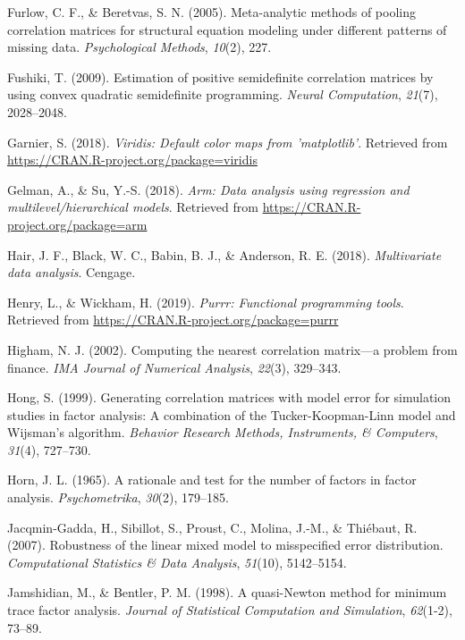 \documentclass[
  english,
  man]{apa6}
\begin{document}
\leavevmode\hypertarget{ref-furlow2005}{}%
Furlow, C. F., \& Beretvas, S. N. (2005). Meta-analytic methods of pooling correlation matrices for structural equation modeling under different patterns of missing data. \emph{Psychological Methods}, \emph{10}(2), 227.

\leavevmode\hypertarget{ref-fushiki2009}{}%
Fushiki, T. (2009). Estimation of positive semidefinite correlation matrices by using convex quadratic semidefinite programming. \emph{Neural Computation}, \emph{21}(7), 2028--2048.

\leavevmode\hypertarget{ref-R-viridis}{}%
Garnier, S. (2018). \emph{Viridis: Default color maps from 'matplotlib'}. Retrieved from \url{https://CRAN.R-project.org/package=viridis}

\leavevmode\hypertarget{ref-R-arm}{}%
Gelman, A., \& Su, Y.-S. (2018). \emph{Arm: Data analysis using regression and multilevel/hierarchical models}. Retrieved from \url{https://CRAN.R-project.org/package=arm}

\leavevmode\hypertarget{ref-hair2018}{}%
Hair, J. F., Black, W. C., Babin, B. J., \& Anderson, R. E. (2018). \emph{Multivariate data analysis}. Cengage.

\leavevmode\hypertarget{ref-R-purrr}{}%
Henry, L., \& Wickham, H. (2019). \emph{Purrr: Functional programming tools}. Retrieved from \url{https://CRAN.R-project.org/package=purrr}

\leavevmode\hypertarget{ref-higham2002}{}%
Higham, N. J. (2002). Computing the nearest correlation matrix---a problem from finance. \emph{IMA Journal of Numerical Analysis}, \emph{22}(3), 329--343.

\leavevmode\hypertarget{ref-hong1999}{}%
Hong, S. (1999). Generating correlation matrices with model error for simulation studies in factor analysis: A combination of the Tucker-Koopman-Linn model and Wijsman's algorithm. \emph{Behavior Research Methods, Instruments, \& Computers}, \emph{31}(4), 727--730.

\leavevmode\hypertarget{ref-horn1965}{}%
Horn, J. L. (1965). A rationale and test for the number of factors in factor analysis. \emph{Psychometrika}, \emph{30}(2), 179--185.

\leavevmode\hypertarget{ref-jacqmin2007}{}%
Jacqmin-Gadda, H., Sibillot, S., Proust, C., Molina, J.-M., \& Thiébaut, R. (2007). Robustness of the linear mixed model to misspecified error distribution. \emph{Computational Statistics \& Data Analysis}, \emph{51}(10), 5142--5154.

\leavevmode\hypertarget{ref-jamshidian1998}{}%
Jamshidian, M., \& Bentler, P. M. (1998). A quasi-Newton method for minimum trace factor analysis. \emph{Journal of Statistical Computation and Simulation}, \emph{62}(1-2), 73--89.
\end{document}
